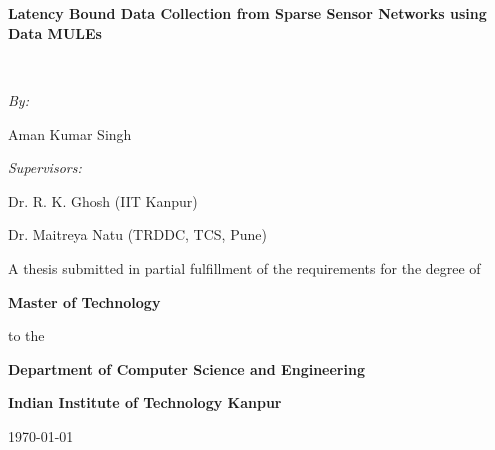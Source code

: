 \setcounter{page}{1}
\thispagestyle{empty}
\begin{titlepage}
\begin{center}



\textsc{\Large }\\[0.5cm]

\HRule \\[0.4cm]
{ \huge \bfseries Latency Bound Data Collection from Sparse Sensor Networks using Data MULEs \\[0.4cm] }

\HRule \\[1.5cm]

\begin{minipage}{0.4\textwidth}
\begin{flushleft} \large
\emph{By:}

Aman Kumar Singh
\end{flushleft}
\end{minipage}
\begin{minipage}{0.4\textwidth}
\begin{flushright} \large
\emph{Supervisors:}

Dr. R. K. Ghosh (IIT Kanpur)

Dr. Maitreya Natu (TRDDC, TCS, Pune)
\end{flushright}
\end{minipage}

\vspace{5cm}

A thesis submitted in partial fulfillment of the requirements for the degree of

{\bf Master of Technology}

to the

{\bf Department of Computer Science and Engineering}

{\bf Indian Institute of Technology Kanpur}

\vfill

{\large \today}

\end{center}
\end{titlepage}
